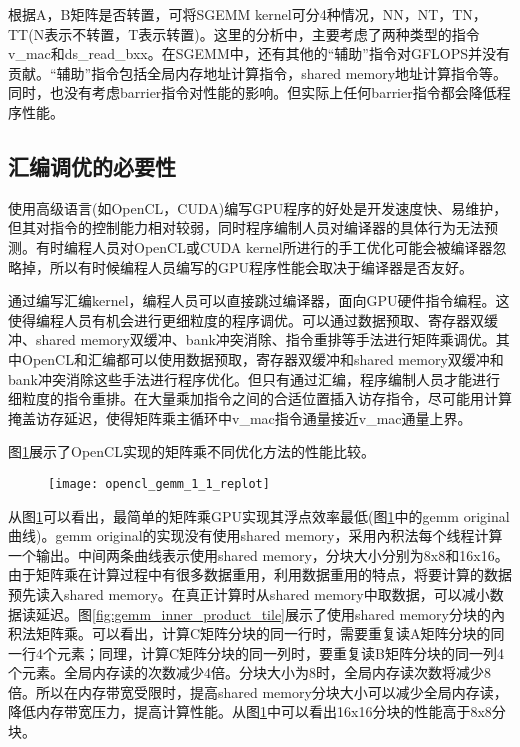 根据A，B矩阵是否转置，可将SGEMM kernel可分4种情况，NN，NT，TN，TT(N表示不转置，T表示转置)。这里的分析中，主要考虑了两种类型的指令v\_mac和ds\_read\_bxx。在SGEMM中，还有其他的“辅助”指令对GFLOPS并没有贡献。“辅助”指令包括全局内存地址计算指令，shared memory地址计算指令等。同时，也没有考虑barrier指令对性能的影响。但实际上任何barrier指令都会降低程序性能。

\subsection{汇编调优的必要性}
使用高级语言(如OpenCL，CUDA)编写GPU程序的好处是开发速度快、易维护，但其对指令的控制能力相对较弱，同时程序编制人员对编译器的具体行为无法预测。有时编程人员对OpenCL或CUDA kernel所进行的手工优化可能会被编译器忽略掉，所以有时候编程人员编写的GPU程序性能会取决于编译器是否友好。

通过编写汇编kernel，编程人员可以直接跳过编译器，面向GPU硬件指令编程。这使得编程人员有机会进行更细粒度的程序调优。可以通过数据预取、寄存器双缓冲、shared memory双缓冲、bank冲突消除、指令重排等手法进行矩阵乘调优。其中OpenCL和汇编都可以使用数据预取，寄存器双缓冲和shared memory双缓冲和bank冲突消除这些手法进行程序优化。但只有通过汇编，程序编制人员才能进行细粒度的指令重排。在大量乘加指令之间的合适位置插入访存指令，尽可能用计算掩盖访存延迟，使得矩阵乘主循环中v\_mac指令通量接近v\_mac通量上界。

图\ref{fig:opencl_gemm_1_1_replot}展示了OpenCL实现的矩阵乘不同优化方法的性能比较。

\begin{figure}[htbp]
	\centering
	\texttt{[image: opencl\_gemm\_1\_1\_replot]}
	\label{fig:opencl_gemm_1_1_replot}
\end{figure}

从图\ref{fig:opencl_gemm_1_1_replot}可以看出，最简单的矩阵乘GPU实现其浮点效率最低(图\ref{fig:opencl_gemm_1_1_replot}中的gemm original曲线)。gemm original的实现没有使用shared memory，采用內积法每个线程计算一个输出。中间两条曲线表示使用shared memory，分块大小分别为8x8和16x16。由于矩阵乘在计算过程中有很多数据重用，利用数据重用的特点，将要计算的数据预先读入shared memory。在真正计算时从shared memory中取数据，可以减小数据读延迟。图\ref{fig:gemm_inner_product_tile}展示了使用shared memory分块的內积法矩阵乘。可以看出，计算C矩阵分块的同一行时，需要重复读A矩阵分块的同一行4个元素；同理，计算C矩阵分块的同一列时，要重复读B矩阵分块的同一列4个元素。全局内存读的次数减少4倍。分块大小为8时，全局内存读次数将减少8倍。所以在内存带宽受限时，提高shared memory分块大小可以减少全局内存读，降低内存带宽压力，提高计算性能。从图\ref{fig:opencl_gemm_1_1_replot}中可以看出16x16分块的性能高于8x8分块。

